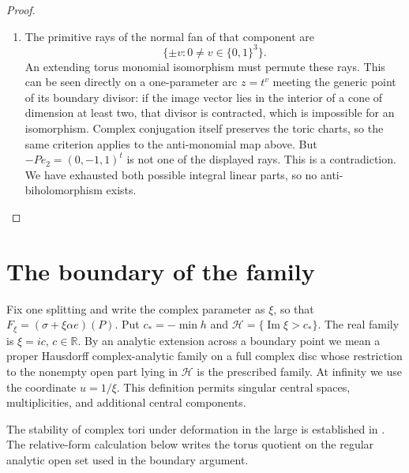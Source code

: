 \begin{proof}
\begin{enumerate}[label={$\langle1\rangle$\arabic*.}]
\item The primitive rays of the normal fan of that component are
\[
\{\pm v:0\ne v\in\{0,1\}^3\}.
\]
An extending torus monomial isomorphism must permute these rays.
This can be seen directly on a one-parameter arc $z=t^v$ meeting the
generic point of its boundary divisor: if the image vector lies in
the interior of a cone of dimension at least two, that divisor is
contracted, which is impossible for an isomorphism.  Complex
conjugation itself preserves the toric charts, so the same criterion
applies to the anti-monomial map above.
But $-Pe_2=(0,-1,1)^t$ is not one of the displayed rays.
This is a contradiction.  We have exhausted both possible integral
linear parts, so no anti-biholomorphism exists.


\end{enumerate}
\end{proof}


\section{The boundary of the family}

Fix one splitting and write the complex parameter as $\xi$, so that
$F_\xi=(\sigma+\xi\alpha e)(P)$. Put
$c_*=-\min h$ and $\mathcal H=\{\operatorname{Im}\xi>c_*\}$.
The real family is $\xi=ic$, $c\in\mathbb R$.
By an analytic extension across a boundary point we mean a proper
Hausdorff complex-analytic family on a full complex disc whose
restriction to the nonempty open part lying in $\mathcal H$ is
the prescribed family. At infinity we use the coordinate $u=1/\xi$.
This definition permits singular central spaces, multiplicities,
and additional central components.

The stability of complex tori under deformation in the large is
established in \cite[definition, p.~261; Theorem 2.1, p.~264]{Catanese2004}.
The relative-form calculation below writes the torus quotient
on the regular analytic open set used in the boundary argument.


